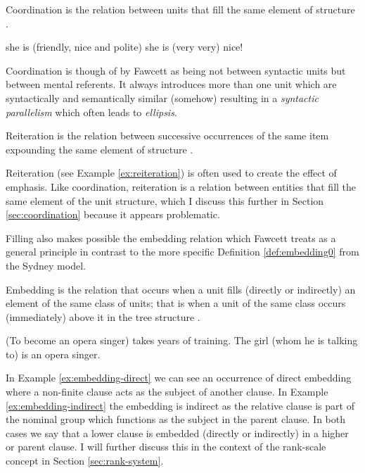 \begin{definition}[Coordination]\label{def:coordination}
    Coordination is the relation between units that fill the same element of structure \citep[263]{Fawcett2000}. 
\end{definition}

\begin{exe}
    \ex\label{ex:coordination} she is (friendly, nice and polite)
    \ex\label{ex:reiteration} she is (very very) nice!
\end{exe}

Coordination is though of by Fawcett as being not between syntactic units but between mental referents. It always introduces more than one unit which are syntactically and semantically similar (somehow) resulting in a \textit{syntactic parallelism} which often leads to \textit{ellipsis}. 

\begin{definition}[Reiteration]\label{def:reiteration}
    Reiteration is the relation between successive occurrences of the same item expounding the same element of structure  \citep[271]{Fawcett2000}. 
\end{definition}

Reiteration (see Example \ref{ex:reiteration}) is often used to create the effect of emphasis. Like coordination, reiteration is a relation between entities that fill the same element of the unit structure, which I discuss this further in Section \ref{sec:coordination} because it appears problematic.

Filling also makes possible the embedding relation  which Fawcett treats as a general principle in contrast to the more specific Definition \ref{def:embedding0} from the Sydney model.

\begin{definition}\label{def:embedding}
    Embedding is the relation that occurs when a unit fills (directly or indirectly) an element of the same class of units; that is when a unit of the same class occurs (immediately) above it in the tree structure \citep[264]{Fawcett2000}. 
\end{definition}

\begin{exe}
    \ex\label{ex:embedding-direct} (To become an opera singer) takes years of training.
    \ex\label{ex:embedding-indirect} The girl (whom he is talking to) is an opera singer.
\end{exe}

In Example \ref{ex:embedding-direct} we can see an occurrence of direct embedding where a non-finite clause acts as the subject of another clause. In Example \ref{ex:embedding-indirect} the embedding is indirect as the relative clause is part of the nominal group which functions as the subject in the parent clause. In both cases we say that a lower clause is embedded (directly or indirectly) in a higher or parent clause. I will further discuss this in the context of the rank-scale concept in Section \ref{sec:rank-system}.

